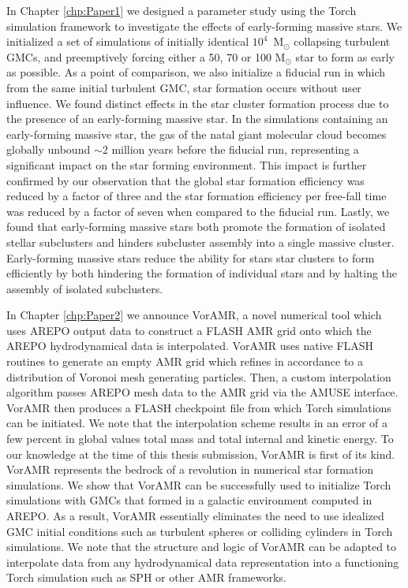 \documentclass[twoside]{drexel-thesis}
\begin{document}
\begin{thesis}
In Chapter \ref{chp:Paper1} we designed a parameter study using the Torch simulation framework to investigate the effects of early-forming massive stars. We initialized a set of simulations of initially identical $10^4$~M$_\odot$ collapsing turbulent GMCs, and preemptively forcing either a 50, 70 or 100 M$_\odot$ star to form as early as possible. As a point of comparison, we also initialize a fiducial run in which from the same initial turbulent GMC, star formation occurs without user influence. We found distinct effects in the star cluster formation process due to the presence of an early-forming massive star. In the simulations containing an early-forming massive star, the gas of the natal giant molecular cloud becomes globally unbound $\sim$2 million years before the fiducial run, representing a significant impact on the star forming environment. This impact is further confirmed by our observation that the global star formation efficiency was reduced by a factor of three and the star formation efficiency per free-fall time was reduced by a factor of seven when compared to the fiducial run. Lastly, we found that early-forming massive stars both promote the formation of isolated stellar subclusters and hinders subcluster assembly into a single massive cluster. Early-forming massive stars reduce the ability for stars star clusters to form efficiently by both hindering the formation of individual stars and by halting the assembly of isolated subclusters.

In Chapter \ref{chp:Paper2} we announce VorAMR, a novel numerical tool which uses AREPO output data to construct a FLASH AMR grid onto which the AREPO hydrodynamical data is interpolated. VorAMR uses native FLASH routines to generate an empty AMR grid which refines in accordance to a distribution of Voronoi mesh generating particles. Then, a custom interpolation algorithm passes AREPO mesh data to the AMR grid via the AMUSE interface. VorAMR then produces a FLASH checkpoint file from which Torch simulations can be initiated. We note that the interpolation scheme results in an error of a few percent in global values total mass and total internal and kinetic energy. To our knowledge at the time of this thesis submission, VorAMR is first of its kind. VorAMR represents the bedrock of a revolution in numerical star formation simulations. We show that VorAMR can be successfully used to initialize Torch simulations with GMCs that formed in a galactic environment computed in AREPO. As a result, VorAMR essentially eliminates the need to use idealized GMC initial conditions such as turbulent spheres or colliding cylinders in Torch simulations. We note that the structure and logic of VorAMR can be adapted to interpolate data from any hydrodynamical data representation into a functioning Torch simulation such as SPH or other AMR frameworks.


\end{thesis}
\end{document}
